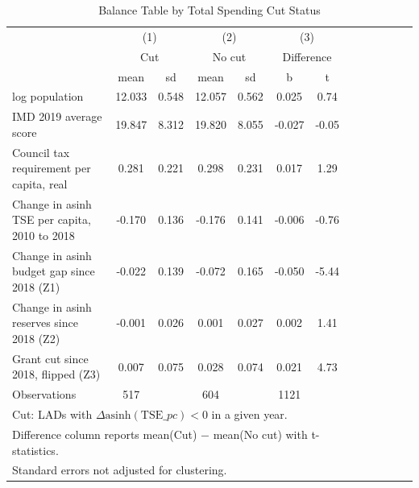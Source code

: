 \begin{table}[htbp]\centering
\def\sym#1{\ifmmode^{#1}\else\(^{#1}\)\fi}
\caption{Balance Table by Total Spending Cut Status}
\begin{tabular}{l*{3}{cccc}}
\toprule
                    &\multicolumn{2}{c}{(1)}  &\multicolumn{2}{c}{(2)}  &\multicolumn{2}{c}{(3)}  \\
                    &\multicolumn{2}{c}{Cut}  &\multicolumn{2}{c}{No cut}&\multicolumn{2}{c}{Difference}\\
                    &        mean&          sd&        mean&          sd&           b&           t\\
\midrule
log population      &      12.033&       0.548&      12.057&       0.562&       0.025&        0.74\\
IMD 2019 average score&      19.847&       8.312&      19.820&       8.055&      -0.027&       -0.05\\
Council tax requirement per capita, real&       0.281&       0.221&       0.298&       0.231&       0.017&        1.29\\
Change in asinh TSE per capita, 2010 to 2018&      -0.170&       0.136&      -0.176&       0.141&      -0.006&       -0.76\\
Change in asinh budget gap since 2018 (Z1)&      -0.022&       0.139&      -0.072&       0.165&      -0.050&       -5.44\\
Change in asinh reserves since 2018 (Z2)&      -0.001&       0.026&       0.001&       0.027&       0.002&        1.41\\
Grant cut since 2018, flipped (Z3)&       0.007&       0.075&       0.028&       0.074&       0.021&        4.73\\
\midrule
Observations        &         517&            &         604&            &        1121&            \\
\bottomrule
\multicolumn{7}{l}{\footnotesize Cut: LADs with $\Delta\text{asinh}(\text{TSE}\_{pc}) < 0$ in a given year.}\\
\multicolumn{7}{l}{\footnotesize Difference column reports mean(Cut) $-$ mean(No cut) with t-statistics.}\\
\multicolumn{7}{l}{\footnotesize Standard errors not adjusted for clustering.}\\
\end{tabular}
\end{table}
